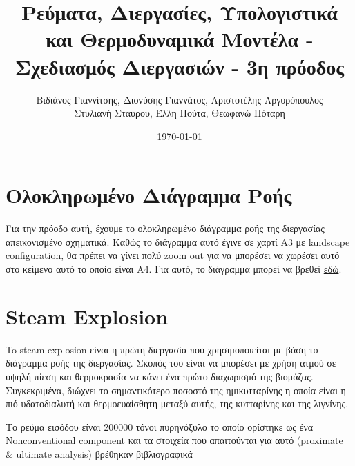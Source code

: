 \documentclass[11pt]{article}
\author{Βιδιάνος Γιαννίτσης, Διονύσης Γιαννάτος, Αριστοτέλης Αργυρόπουλος \\ Στυλιανή Σταύρου, Έλλη Πούτα, Θεωφανώ Πόταρη}
\date{\today}
\title{Ρεύματα, Διεργασίες, Υπολογιστικά και Θερμοδυναμικά Μοντέλα - Σχεδιασμός Διεργασιών - 3η πρόοδος}
\begin{document}
\maketitle
\tableofcontents

\renewcommand{\abstractname}{Περίληψη}
\renewcommand{\tablename}{Πίνακας}
\renewcommand{\figurename}{Σχήμα}
\renewcommand\listingscaption{Κώδικας}

\pagebreak

\section{Ολοκληρωμένο Διάγραμμα Ροής}
\label{sec:org85a2753}
Για την πρόοδο αυτή, έχουμε το ολοκληρωμένο διάγραμμα ροής της διεργασίας απεικονισμένο σχηματικά. Καθώς το διάγραμμα αυτό έγινε σε χαρτί Α3 με landscape configuration, θα πρέπει να γίνει πολύ zoom out για να μπορέσει να χωρέσει αυτό στο κείμενο αυτό το οποίο είναι Α4. Για αυτό, το διάγραμμα μπορεί να βρεθεί \href{https://github.com/Vidianos-Giannitsis/Process-Design/blob/master/Diagrams/complete\_flowsheet.pdf}{εδώ}. 

\section{Steam Explosion}
\label{sec:org646799b}
To steam explosion είναι η πρώτη διεργασία που χρησιμοποιείται με βάση το διάγραμμα ροής της διεργασίας. Σκοπός του είναι να μπορέσει με χρήση ατμού σε υψηλή πίεση και θερμοκρασία να κάνει ένα πρώτο διαχωρισμό της βιομάζας. Συγκεκριμένα, διώχνει το σημαντικότερο ποσοστό της ημικυτταρίνης η οποία είναι η πιό υδατοδιαλυτή και θερμοευαίσθητη μεταξύ αυτής, της κυτταρίνης και της λιγνίνης.

Το ρεύμα εισόδου είναι 200000 τόνοι πυρηνόξυλο το οποίο ορίστηκε ως ένα Nonconventional component και τα στοιχεία που απαιτούνται για αυτό (proximate \& ultimate analysis) βρέθηκαν βιβλιογραφικά \cite{koutsomitopoulouPreparationCharacterizationOlive2014,gonzalezCombustionOptimisationBiomass2004} 
\end{document}
